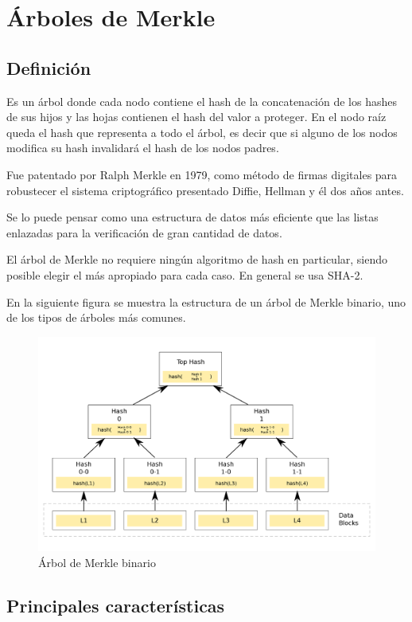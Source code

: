 
\section{Árboles de Merkle}

\subsection{Definición}

Es un \'arbol donde cada nodo contiene el hash de la concatenación de los hashes de sus hijos y las hojas contienen el hash del valor a proteger. En el nodo ra\'iz queda el hash que representa a todo el \'arbol, es decir que si alguno de los nodos modifica su hash invalidar\'a el hash de los nodos padres.

Fue patentado por Ralph Merkle en 1979, como m\'etodo de firmas digitales para robustecer el sistema criptogr\'afico presentado Diffie, Hellman y \'el dos a\~nos antes.

Se lo puede pensar como una estructura de datos más eficiente que las listas enlazadas para la verificación de gran cantidad de datos. 

El árbol de Merkle no requiere ningún algoritmo de hash en particular, siendo posible elegir el más apropiado para cada caso. En general se usa SHA-2.

En la siguiente figura se muestra la estructura de un árbol de Merkle binario, uno de los tipos de árboles más comunes.

\begin{figure}[H]
\centering
\includegraphics[scale=0.19]{imagenes/hash_tree.png}
\caption{Árbol de Merkle binario}
\end{figure}


\subsection{Principales caracter\'isticas}

